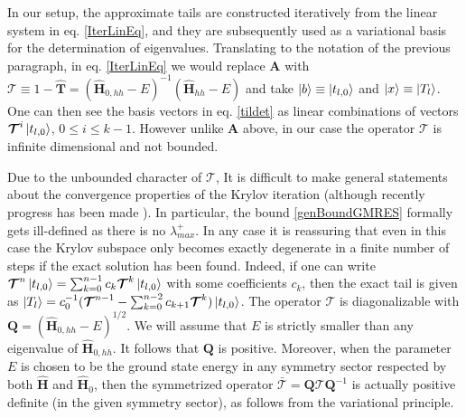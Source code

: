 \documentclass[twocolumn,secnumarabic,amssymb, nobibnotes, aps, prd]{revtex4-2}
\begin{document}
In our setup, the approximate tails are constructed iteratively from the linear system in eq. \eqref{IterLinEq}, and they are subsequently used as a variational basis for the determination of eigenvalues. Translating to the notation of the previous paragraph, in eq. \eqref{IterLinEq} we would replace $\mathbf{A}$ with $\boldsymbol{\mathcal{T}}\equiv1-\hat{\mathbf T}=(\hat{\mathbf{H}}_{0,hh}-E)^{-1}(\hat{\mathbf{H}}_{hh}-E)$ and take $\ket{b}\equiv{\ket{t_{l,0}}}$ and $\ket{x}\equiv\ket{T_l}$. One can then see the basis vectors in eq. \eqref{tildet} as linear combinations of vectors $\boldsymbol{\mathcal{T}}^i\ket{t_{l,0}}$, $0\leq i \leq k-1$. However unlike $\mathbf{A}$ above, in our case the operator $\boldsymbol{\mathcal{T}}$ is infinite dimensional and not bounded.

Due to the unbounded character of $\boldsymbol{\mathcal{T}}$, It is difficult to make general statements about the convergence properties of the Krylov iteration (although recently progress has been made \cite{Caruso:2019,Caruso:2020}). In particular, the bound \eqref{genBoundGMRES} formally gets ill-defined as there is no $\lambda_{max}^+$.  In any case it is reassuring that even in this case the Krylov subspace only becomes exactly degenerate in a finite number of steps if the exact solution has been found. Indeed, if one can write $\boldsymbol{\mathcal{T}}^n\ket{t_{l,0}}=\sum_{k=0}^{n-1}c_k\boldsymbol{\mathcal{T}}^k\ket{t_{l,0}}$ with some coefficients $c_k$, then the exact tail is given as $\ket{T_l}=c_0^{-1}(\boldsymbol{\mathcal{T}}^{n-1}-\sum_{k=0}^{n-2}c_{k+1}\boldsymbol{\mathcal{T}}^k)\ket{t_{l,0}}$. 
The operator $\boldsymbol{\mathcal{T}}$ is diagonalizable with $\mathbf{Q}=(\hat{\mathbf{H}}_{0,hh}-E)^{1/2}$.  We will assume that $E$ is strictly smaller than any eigenvalue of $\hat{\mathbf{H}}_{0,hh}$. It follows that $\mathbf{Q}$ is positive. Moreover, when the parameter $E$ is chosen to be the ground state energy in any symmetry sector respected by both $\hat{\mathbf{H}}$ and $\hat{\mathbf{H}}_0$, then the symmetrized operator $\bar{\boldsymbol{\mathcal{T}}}=\mathbf{Q}\boldsymbol{\mathcal{T}}\mathbf{Q}^{-1}$ is actually positive definite (in the given symmetry sector), as follows from the variational principle.
\end{document}

